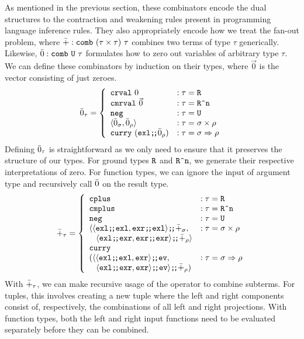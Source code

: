   As mentioned in the previous section, these combinators encode the dual structures to the contraction and weakening rules present in programming language inference rules.
  They also appropriately encode how we treat the fan-out problem, where $\bar{+} : \texttt{comb}\ (\tau \times \tau)\ \tau$ combines two terms of type $\tau$ generically.
  Likewise, $\bar{0} : \texttt{comb}\ \texttt{U}\ \tau$ formulates how to zero out variables of arbitrary type $\tau$.
  We can define these combinators by induction on their types, where $\vec{0}$ is the vector consisting of just zeroes.
  \begin{align*}
    \bar{0}_\tau =
      \left\{
        \begin{array}{ll}
          \texttt{crval}\ 0 & : \tau = \texttt{R} \\
          \texttt{cmrval}\ \vec{0} & : \tau = \texttt{R\^{}n} \\
          \texttt{neg} & : \tau = \texttt{U} \\
          \langle \bar{0}_\sigma, \bar{0}_\rho \rangle & : \tau = \sigma \times \rho \\
          \texttt{curry}\ (\texttt{exl} \texttt{;\!;} \bar{0}_\rho) & : \tau = \sigma \Rightarrow \rho \\
        \end{array}
      \right.
  \end{align*}
  Defining $\bar{0}_\tau$ is straightforward as we only need to ensure that it preserves the structure of our types.
  For ground types $\texttt{R}$ and $\texttt{R\^{}n}$, we generate their respective interpretations of zero.
  For function types, we can ignore the input of argument type and recursively call $\bar{0}$ on the result type.
  \begin{align*}
    \synP_\tau =
      \left\{
        \begin{array}{ll}
          \synCplus & : \tau = \synR \\
          \synCmplus & : \tau = \synRn \\
          \synNeg & : \tau = \synUnit \\
          \langle
            \synSeq{\langle \synSeq{\synExl}{\synExl}, \synSeq{\synExr}{\synExl} \rangle}{\synP_\sigma}, & : \tau = \sigma \synStar \rho \\
            \;\;\;\synSeq{\langle \synSeq{\synExl}{\synExr}, \synSeq{\synExr}{\synExr} \rangle}{\synP_\rho} \rangle \\
          \synCurry{ \\
            (\synSeq{\langle
              \synSeq{\langle \synSeq{\synExl}{\synExl}, \synExr \rangle}{\synEv}, & : \tau = \sigma \synFunc \rho \\
              \;\;\;\synSeq{\langle \synSeq{\synExl}{\synExr}, \synExr \rangle}{\synEv} \rangle}{\synP_\rho})} \\
        \end{array}
      \right.
  \end{align*}
  With $\bar{+}_\tau$, we can make recursive usage of the operator to combine subterms.
  For tuples, this involves creating a new tuple where the left and right components consist of, respectively, the combinations of all left and right projections.
  With function types, both the left and right input functions need to be evaluated separately before they can be combined.

